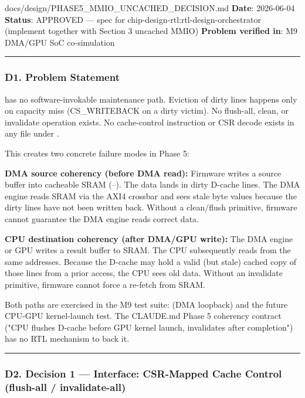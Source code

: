 \begin{relocated}{docs/design/PHASE5_MMIO_UNCACHED_DECISION.md}
\textbf{Date}: 2026-06-04 \textbf{Status}: APPROVED --- spec for
chip-design-rtl:rtl-design-orchestrator (implement together with Section
3 uncached MMIO) \textbf{Problem verified in}: M9 DMA/GPU SoC
co-simulation

\begin{center}\rule{0.5\linewidth}{0.5pt}\end{center}

\subsubsection{D1. Problem Statement}\label{ds:dec:phase5-mmio-uncached:d1-problem-statement}

 has no software-invokable maintenance path.
Eviction of dirty lines happens only on capacity miss
(CS\_\allowbreak{}WRITEBACK on a dirty victim). No flush-all, clean, or
invalidate operation exists. No cache-control instruction or CSR decode
exists in any file under .

This creates two concrete failure modes in Phase 5:

\textbf{DMA source coherency (before DMA read):} Firmware writes a
source buffer into cacheable SRAM
(--). The data lands in dirty
D-cache lines. The DMA engine reads SRAM via the AXI4 crossbar and sees
stale byte values because the dirty lines have not been written back.
Without a clean/\allowbreak{}flush primitive, firmware cannot guarantee
the DMA engine reads correct data.

\textbf{CPU destination coherency (after DMA/GPU write):} The DMA engine
or GPU writes a result buffer to SRAM. The CPU subsequently reads from
the same addresses. Because the D-cache may hold a valid (but stale)
cached copy of those lines from a prior access, the CPU sees old data.
Without an invalidate primitive, firmware cannot force a re-fetch from
SRAM.

Both paths are exercised in the M9 test suite:
 (DMA loopback) and the future CPU-GPU
kernel-launch test. The CLAUDE.md Phase 5 coherency contract ("CPU
flushes D-cache before GPU kernel launch, invalidates after completion")
has no RTL mechanism to back it.

\begin{center}\rule{0.5\linewidth}{0.5pt}\end{center}

\subsubsection{D2. Decision 1 --- Interface: CSR-Mapped Cache Control
(flush-all / invalidate-all)}\label{ds:dec:phase5-mmio-uncached:d2-decision-1-interface-csr-mapped-cache-control-flush-all-invalidate-all}


\end{relocated}
